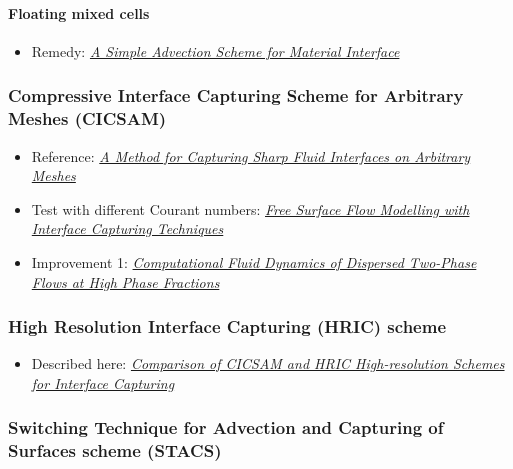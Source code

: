 \documentclass[]{report}
\begin{document}
\paragraph{Floating mixed cells}

\begin{itemize}
    \item Remedy: \textit{\href{https://e-reports-ext.llnl.gov/pdf/245038.pdf}{A Simple Advection Scheme for Material Interface}}
\end{itemize}

\subsubsection{Compressive Interface Capturing Scheme for Arbitrary Meshes (CICSAM)}

\begin{itemize}
    \item Reference: \textit{\href{http://ac.els-cdn.com/S0021999199962769/1-s2.0-S0021999199962769-main.pdf?_tid=85161b57da5f4401e55c9d07495e24ea&acdnat=1336167249_a59e4f578adbacf3bff69936c48cdd57}{A Method for Capturing Sharp Fluid Interfaces on Arbitrary Meshes}}
    \item Test with different Courant numbers: \textit{\href{http://www.marin.nl/upload_mm/8/2/c/1807524470_1999999096_2007-ECCOMAS_HoekstraVazAbeilBunnik.pdf}{Free Surface Flow Modelling with Interface Capturing Techniques}}
    \item Improvement 1: \textit{\href{http://powerlab.fsb.hr/ped/kturbo/openfoam/docs/HenrikRuschePhD2002.pdf}{Computational Fluid Dynamics of Dispersed Two-Phase Flows at High Phase Fractions}}
\end{itemize}

\subsubsection{High Resolution Interface Capturing (HRIC) scheme}

\begin{itemize}
    \item Described here: \textit{\href{http://warminski.pollub.plwww.ptmts.org.pl/Waclaw-Koron-2-08.pdf}{Comparison of CICSAM and HRIC High-resolution Sche\-mes for Interface Capturing}}
\end{itemize}

\subsubsection{Switching Technique for Advection and Capturing of Surfaces scheme (STACS)}
\end{document}
